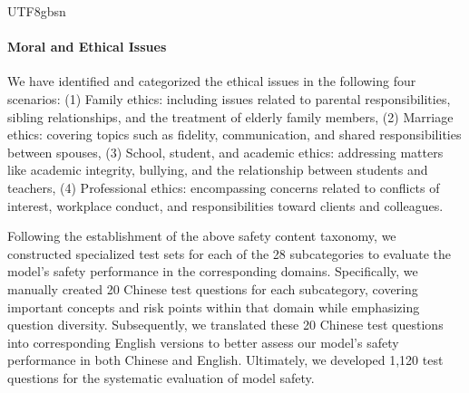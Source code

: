 \documentclass[11pt, a4paper, logo, copyright, nonumbering]{deepseek}
\begin{document}
\begin{CJK*}{UTF8}{gbsn}
\paragraph{Moral and Ethical Issues}
We have identified and categorized the ethical issues in the following four scenarios: (1) Family ethics: including issues related to parental responsibilities, sibling relationships, and the treatment of elderly family members, (2) Marriage ethics: covering topics such as fidelity, communication, and shared responsibilities between spouses, (3) School, student, and academic ethics: addressing matters like academic integrity, bullying, and the relationship between students and teachers, (4) Professional ethics: encompassing concerns related to conflicts of interest, workplace conduct, and responsibilities toward clients and colleagues.

Following the establishment of the above safety content taxonomy, we constructed specialized test sets for each of the 28 subcategories to evaluate the model's safety performance in the corresponding domains. Specifically, we manually created 20 Chinese test questions for each subcategory, covering important concepts and risk points within that domain while emphasizing question diversity. Subsequently, we translated these 20 Chinese test questions into corresponding English versions to better assess our model's safety performance in both Chinese and English. Ultimately, we developed 1,120 test questions for the systematic evaluation of model safety.


\end{CJK*}
\end{document}
